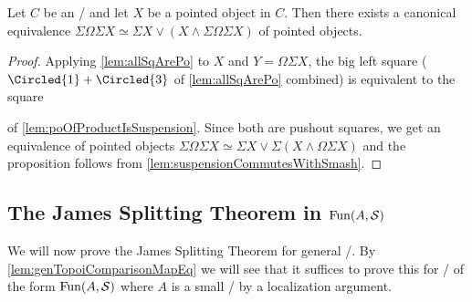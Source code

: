\begin{corollary}\label{cor:fundamentalJamesSplitting}
    Let $C$ be an \inftytop/ and let $X$ be a pointed object in $C$. 
    Then there exists a canonical equivalence $\Sigma\Omega\Sigma X\simeq\Sigma X\vee\left(X\wedge\Sigma\Omega\Sigma X\right)$ of pointed objects.
    \begin{proof}
        Applying \cref{lem:allSqArePo} to $X$ and $Y=\Omega\Sigma X$, the big left square ($\Circled{1}+\Circled{3}$ of \cref{lem:allSqArePo} combined) is equivalent to the square 
        \begin{center}
        \end{center}
        of \cref{lem:poOfProductIsSuspension}.
        Since both are pushout squares, we get an equivalence of pointed objects $\Sigma\Omega\Sigma X\simeq\Sigma X\vee\Sigma\left(X\wedge\Omega\Sigma X\right)$ and the proposition follows from \cref{lem:suspensionCommutesWithSmash}.
    \end{proof}
\end{corollary}
\subsection*{The James Splitting Theorem in $\operatorname{Fun}(A,\mathcal{S})$}
We will now prove the James Splitting Theorem for general \inftytops/.
By \cref{lem:genTopoiComparisonMapEq} we will see that it suffices to prove this for \inftytops/ of the form $\operatorname{Fun}(A,\mathcal{S})$ where $A$ is a small \inftycat/ by a localization argument.

